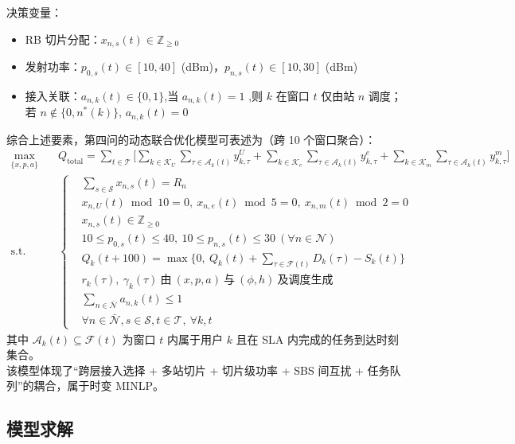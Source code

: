 决策变量：
\begin{itemize}
  \item RB 切片分配：$x_{n,s}(t)\in\mathbb{Z}_{\ge 0}$
  \item 发射功率：$p_{0,s}(t)\in[10,40]$ (dBm)，$p_{n,s}(t)\in[10,30]$ (dBm)
  \item 接入关联：$a_{n,k}(t)\in\{0,1\}$,当 $a_{n,k}(t)=1$ ,则 $k$ 在窗口 $t$ 仅由站 $n$ 调度；若 $n\notin\{0,n^*(k)\}$, $a_{n,k}(t)=0$
\end{itemize}
综合上述要素，第四问的动态联合优化模型可表述为（跨 10 个窗口聚合）：
\begin{equation}
\begin{aligned}
\max\limits_{\{x,p,a\}}\quad & Q_{\text{total}}=\sum_{t\in\mathcal{T}}\Bigg[\sum_{k\in\mathcal{K}_U}\sum_{\tau\in\mathcal{A}_k(t)} y^{U}_{k,\tau}+\sum_{k\in\mathcal{K}_e}\sum_{\tau\in\mathcal{A}_k(t)} y^{e}_{k,\tau}+\sum_{k\in\mathcal{K}_m}\sum_{\tau\in\mathcal{A}_k(t)} y^{m}_{k,\tau}\Bigg] \\
\text{s.t.}\quad &
\left\{
\begin{aligned}
& \sum_{s\in\mathcal{S}} x_{n,s}(t)=R_n\\
& x_{n,U}(t)\bmod 10=0,\ x_{n,e}(t)\bmod 5=0,\ x_{n,m}(t)\bmod 2=0\\
& x_{n,s}(t)\in\mathbb{Z}_{\ge 0}\\
& 10\le p_{0,s}(t)\le 40,\ 10\le p_{n,s}(t)\le 30\ (\forall n\in\mathcal{N})\\
& Q_k(t+100)=\max\Big\{0,\ Q_k(t)+\sum_{\tau\in\mathcal{F}(t)} D_k(\tau)-S_k(t)\Big\}\\
& r_k(\tau),\ \gamma_k(\tau)\ \text{由}\ (x,p,a)\ \text{与}\ (\phi,h)\ \text{及调度生成}\\
& \sum_{n\in\bar{\mathcal{N}}} a_{n,k}(t)\le 1\\
& \forall n\in\bar{\mathcal{N}},s\in\mathcal{S},t\in\mathcal{T},\ \forall k,t
\end{aligned}
\right.
\end{aligned}
\end{equation}
其中 $\mathcal{A}_k(t)\subseteq\mathcal{F}(t)$ 为窗口 $t$ 内属于用户 $k$ 且在 SLA 内完成的任务到达时刻集合。\\
该模型体现了“跨层接入选择 + 多站切片 + 切片级功率 + SBS 间互扰 + 任务队列”的耦合，属于时变 MINLP。

\subsection{模型求解}

